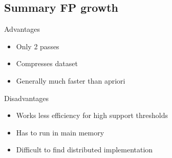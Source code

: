\subsection{Summary FP growth}
Advantages
\begin{itemize}
\item Only 2 passes
\item Compresses dataset
\item Generally much faster than apriori
\end{itemize}
Disadvantages
\begin{itemize}
\item Works less efficiency for high support thresholds
\item Has to run in main memory
\item Difficult to find distributed implementation
\end{itemize}


